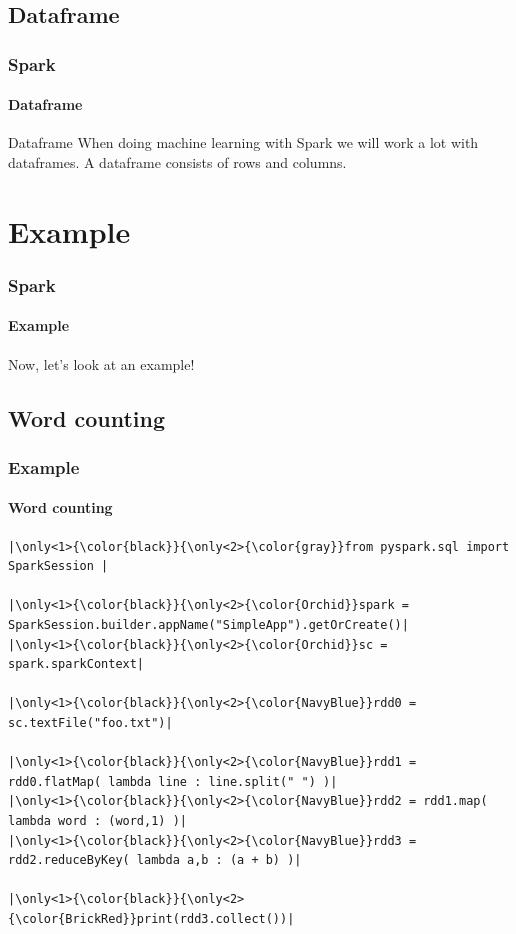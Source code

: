 \documentclass[aspectratio=169,usenames,dvipsnames]{beamer}
\begin{document}
    \subsection{Dataframe}
        \begin{frame}
            \frametitle{Spark}
            \framesubtitle{Dataframe}
            \begin{block}{Dataframe}
                When doing machine learning with Spark we will work a lot with
                dataframes. A dataframe consists of rows and columns.
            \end{block}
        \end{frame}

\section{Example}
        \begin{frame}
            \frametitle{Spark}
            \framesubtitle{Example}
            \begin{center}
                Now, let's look at an example!
            \end{center}
        \end{frame}

\subsection{Word counting}
    \begin{frame}[fragile]
        \frametitle{Example}
        \framesubtitle{Word counting}
        \begin{center}

        \begin{minipage}{0.8\textwidth}
\begin{lstlisting}[escapechar={|}, title=wordcount.py]
|\only<1>{\color{black}}{\only<2>{\color{gray}}from pyspark.sql import SparkSession |

|\only<1>{\color{black}}{\only<2>{\color{Orchid}}spark = SparkSession.builder.appName("SimpleApp").getOrCreate()|
|\only<1>{\color{black}}{\only<2>{\color{Orchid}}sc = spark.sparkContext|

|\only<1>{\color{black}}{\only<2>{\color{NavyBlue}}rdd0 = sc.textFile("foo.txt")|

|\only<1>{\color{black}}{\only<2>{\color{NavyBlue}}rdd1 = rdd0.flatMap( lambda line : line.split(" ") )|
|\only<1>{\color{black}}{\only<2>{\color{NavyBlue}}rdd2 = rdd1.map( lambda word : (word,1) )|
|\only<1>{\color{black}}{\only<2>{\color{NavyBlue}}rdd3 = rdd2.reduceByKey( lambda a,b : (a + b) )|

|\only<1>{\color{black}}{\only<2>{\color{BrickRed}}print(rdd3.collect())|
\end{lstlisting}
\end{minipage}
\end{center}
    \end{frame}
\end{document}
